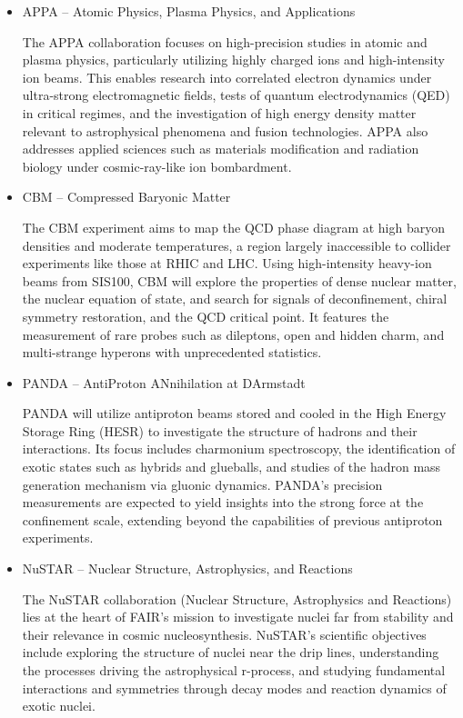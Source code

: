 \begin{itemize}
	\item APPA – Atomic Physics, Plasma Physics, and Applications
	
	The APPA collaboration focuses on high-precision studies in atomic and plasma physics, particularly utilizing highly charged ions and high-intensity ion beams. This enables research into correlated electron dynamics under ultra-strong electromagnetic fields, tests of quantum electrodynamics (QED) in critical regimes, and the investigation of high energy density matter relevant to astrophysical phenomena and fusion technologies. APPA also addresses applied sciences such as materials modification and radiation biology under cosmic-ray-like ion bombardment.
	
	\item CBM – Compressed Baryonic Matter
	
	The CBM experiment aims to map the QCD phase diagram at high baryon densities and moderate temperatures, a region largely inaccessible to collider experiments like those at RHIC and LHC. Using high-intensity heavy-ion beams from SIS100, CBM will explore the properties of dense nuclear matter, the nuclear equation of state, and search for signals of deconfinement, chiral symmetry restoration, and the QCD critical point. It features the measurement of rare probes such as dileptons, open and hidden charm, and multi-strange hyperons with unprecedented statistics.
	
	\item PANDA – AntiProton ANnihilation at DArmstadt
	
	PANDA will utilize antiproton beams stored and cooled in the High Energy Storage Ring (HESR) to investigate the structure of hadrons and their interactions. Its focus includes charmonium spectroscopy, the identification of exotic states such as hybrids and glueballs, and studies of the hadron mass generation mechanism via gluonic dynamics. PANDA's precision measurements are expected to yield insights into the strong force at the confinement scale, extending beyond the capabilities of previous antiproton experiments.
	
	\item NuSTAR – Nuclear Structure, Astrophysics, and Reactions
	
	The NuSTAR collaboration (Nuclear Structure, Astrophysics and Reactions) lies at the heart of FAIR’s mission to investigate nuclei far from stability and their relevance in cosmic nucleosynthesis. NuSTAR's scientific objectives include exploring the structure of nuclei near the drip lines, understanding the processes driving the astrophysical r-process, and studying fundamental interactions and symmetries through decay modes and reaction dynamics of exotic nuclei.
	

\end{itemize}
